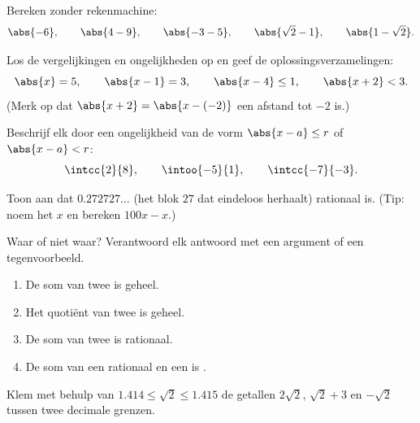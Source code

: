 \begin{exercise}[$\star$]\label{exo:g10:numbers:4}
Bereken zonder rekenmachine:
\[
\abs{-6}, \qquad \abs{4 - 9}, \qquad \abs{-3 - 5}, \qquad
\abs{\sqrt 2 - 1}, \qquad \abs{1 - \sqrt 2}.
\]
\end{exercise}

\begin{exercise}[$\star$]\label{exo:g10:numbers:5}
Los de vergelijkingen en ongelijkheden op en geef de oplossingsverzamelingen:
\[
\abs{x} = 5, \qquad \abs{x - 1} = 3, \qquad \abs{x - 4} \leq 1, \qquad
\abs{x + 2} < 3 .
\]
(Merk op dat $\abs{x+2} = \abs{x - (-2)}$ een afstand tot $-2$ is.)
\end{exercise}

\begin{exercise}[$\star\star$]\label{exo:g10:numbers:6}
Beschrijf elk  door een ongelijkheid van de vorm
$\abs{x - a} \leq r$ of $\abs{x - a} < r$:
\[
\intcc{2}{8}, \qquad \intoo{-5}{1}, \qquad \intcc{-7}{-3}.
\]
\end{exercise}

\begin{exercise}[$\star\star$]\label{exo:g10:numbers:7}
Toon aan dat $0.272727\dots$ (het blok $27$ dat eindeloos herhaalt)
rationaal is. (Tip: noem het $x$ en bereken $100x - x$.)
\end{exercise}

\begin{exercise}[$\star\star$]\label{exo:g10:numbers:8}
Waar of niet waar? Verantwoord elk antwoord met een argument of een
tegenvoorbeeld.
\begin{enumerate}
  \item De som van twee  is geheel.
  \item Het quotiënt van twee  is geheel.
  \item De som van twee  is rationaal.
  \item De som van een rationaal en een  is .
\end{enumerate}
\end{exercise}

\begin{exercise}[$\star\star$]\label{exo:g10:numbers:9}
Klem met behulp van $1.414 \leq \sqrt 2 \leq 1.415$ de getallen $2\sqrt2$,
$\sqrt2 + 3$ en $-\sqrt2$ tussen twee decimale grenzen.
\end{exercise}

